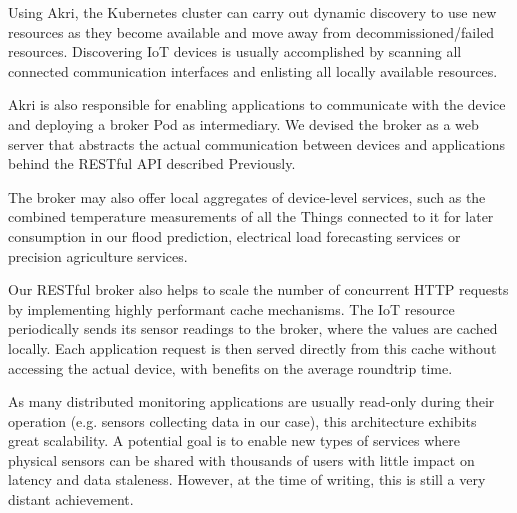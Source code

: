 
Using Akri, the Kubernetes cluster can carry out dynamic discovery to use new resources as they become available and move away from decommissioned/failed resources. Discovering IoT devices is usually accomplished by scanning all connected communication interfaces and enlisting all locally available resources.

Akri is also responsible for enabling applications to communicate with the device and deploying a broker Pod as intermediary. We devised the broker as a web server that abstracts the actual communication between devices and applications behind the RESTful API described Previously.


The broker may also offer local aggregates of device-level services, such as the combined temperature measurements of all the Things connected to it for later consumption in our flood prediction, electrical load forecasting services or precision agriculture services.

Our RESTful broker also helps to scale the number of concurrent HTTP requests by implementing highly performant cache mechanisms. The IoT resource periodically sends its sensor readings to the broker, where the values are cached locally. Each application request is then served directly from this cache without accessing the actual device, with benefits on the average roundtrip time.


As many distributed monitoring applications are usually read-only during their operation (e.g. sensors collecting data in our case), this architecture exhibits great scalability. A potential goal is to enable new types of services where physical sensors can be shared with thousands of users with little impact on latency and data staleness. However, at the time of writing, this is still a very distant achievement.


